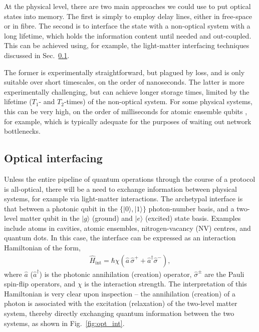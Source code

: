 \documentclass[aps,rmp,twocolumn,amsmath,amssymb,nofootinbib,superscriptaddress]{revtex4}
\newcommand{\ket}[1]{|#1\rangle}
\begin{document}
At the physical level, there are two main approaches we could use to put optical states into memory. The first is simply to employ delay lines, either in free-space or in fibre. The second is to interface the state with a non-optical system with a long lifetime, which holds the information content until needed and out-coupled. This can be achieved using, for example, the light-matter interfacing techniques discussed in Sec.~\ref{sec:opt_inter}.

The former is experimentally straightforward, but plagued by loss, and is only suitable over short timescales, on the order of nanoseconds. The latter is more experimentally challenging, but can achieve longer storage times, limited by the lifetime ($T_1$- and $T_2$-times) of the non-optical system. For some physical systems, this can be very high, on the order of milliseconds for atomic ensemble qubits \cite{???}, for example, which is typically adequate for the purposes of waiting out network bottlenecks.

%
%

\subsection{Optical interfacing} \label{sec:opt_inter}

Unless the entire pipeline of quantum operations through the course of a protocol is all-optical, there will be a need to exchange information between physical systems, for example via light-matter interactions. The archetypal interface is that between a photonic qubit in the \mbox{$\{\ket{0},\ket{1}\}$} photon-number basis, and a two-level matter qubit in the $\ket{g}$ (ground) and $\ket{e}$ (excited) state basis. Examples include atoms in cavities, atomic ensembles, nitrogen-vacancy (NV) centres, and quantum dots. In this case, the interface can be expressed as an interaction Hamiltonian of the form,
\begin{align} \label{eq:two_level_hamil}
\hat{H}_\mathrm{int} = \hbar \chi (\hat{a}\,\hat\sigma^+ + \hat{a}^\dag\hat\sigma^-),
\end{align}
where $\hat{a}$ ($\hat{a}^\dag$) is the photonic annihilation (creation) operator, $\hat\sigma^\pm$ are the Pauli spin-flip operators, and $\chi$ is the interaction strength. The interpretation of this Hamiltonian is very clear upon inspection -- the annihilation (creation) of a photon is associated with the excitation (relaxation) of the two-level matter system, thereby directly exchanging quantum information between the two systems, as shown in Fig.~\ref{fig:opt_int}.
\end{document}
